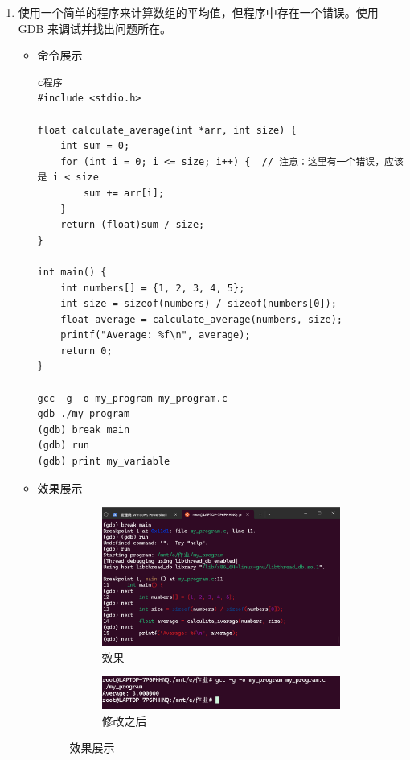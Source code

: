 \documentclass[UTF8]{ctexart}
\begin{document}
\begin{enumerate}
  \item 使用一个简单的程序来计算数组的平均值，但程序中存在一个错误。使用 GDB 来调试并找出问题所在。
  \begin{itemize}
  \item 命令展示
  \begin{verbatim}
c程序
#include <stdio.h>

float calculate_average(int *arr, int size) {
    int sum = 0;
    for (int i = 0; i <= size; i++) {  // 注意：这里有一个错误，应该是 i < size
        sum += arr[i];
    }
    return (float)sum / size;
}

int main() {
    int numbers[] = {1, 2, 3, 4, 5};
    int size = sizeof(numbers) / sizeof(numbers[0]);
    float average = calculate_average(numbers, size);
    printf("Average: %f\n", average);
    return 0;
}

gcc -g -o my_program my_program.c
gdb ./my_program
(gdb) break main
(gdb) run
(gdb) print my_variable

  \end{verbatim}\item 效果展示
\begin{figure}[H]
    \centering
    \begin{subfigure}[b]{0.48\textwidth}
        \includegraphics[width=\textwidth]{161} %
        \caption{效果}
        \label{fig:left}
    \end{subfigure}
    \hfill
    \begin{subfigure}[b]{0.48\textwidth}
        \includegraphics[width=\textwidth]{162} %
        \caption{修改之后}
        \label{fig:right}
    \end{subfigure}
    \caption{效果展示}
    \label{fig:side_by_side}
\end{figure}

  \end{itemize}
\end{enumerate}
\end{document}
